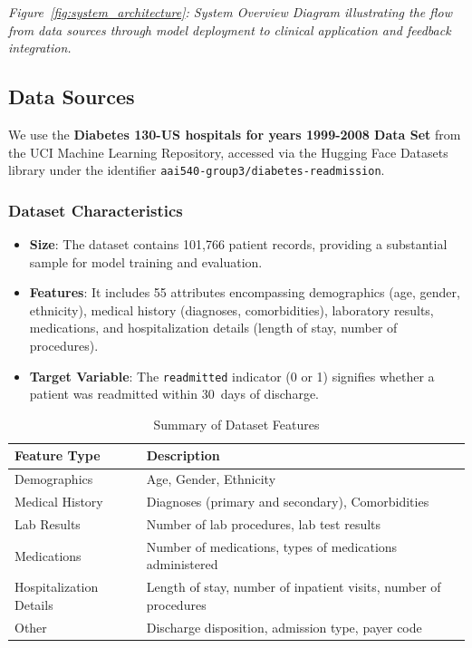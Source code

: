 \documentclass{article}
\begin{document}
\textit{Figure~\ref{fig:system_architecture}: System Overview Diagram illustrating the flow from data sources through model deployment to clinical application and feedback integration.}

\subsection{Data Sources}

We use the \textbf{Diabetes 130-US hospitals for years 1999-2008 Data Set} from the UCI Machine Learning Repository, accessed via the Hugging Face Datasets library under the identifier \texttt{aai540-group3/diabetes-readmission}.

\subsubsection{Dataset Characteristics}

\begin{itemize}[leftmargin=*]
    \item \textbf{Size}: The dataset contains 101,766 patient records, providing a substantial sample for model training and evaluation.
    \item \textbf{Features}: It includes 55 attributes encompassing demographics (age, gender, ethnicity), medical history (diagnoses, comorbidities), laboratory results, medications, and hospitalization details (length of stay, number of procedures).
    \item \textbf{Target Variable}: The \texttt{readmitted} indicator (0 or 1) signifies whether a patient was readmitted within 30~days of discharge.
\end{itemize}

\begin{table}[H]
\centering
\caption{Summary of Dataset Features}\label{tab:dataset_features}
\begin{tabular}{p{3cm} p{10cm}}
\toprule
\textbf{Feature Type} & \textbf{Description} \\
\midrule
Demographics & Age, Gender, Ethnicity \\
Medical History & Diagnoses (primary and secondary), Comorbidities \\
Lab Results & Number of lab procedures, lab test results \\
Medications & Number of medications, types of medications administered \\
Hospitalization Details & Length of stay, number of inpatient visits, number of procedures \\
Other & Discharge disposition, admission type, payer code \\
\bottomrule
\end{tabular}
\end{table}
\end{document}
